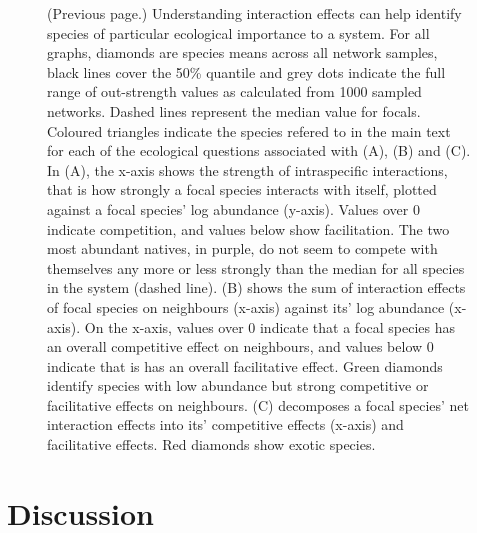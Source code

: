 \documentclass[a4,12pt]{article}
\begin{document}
    \addtocounter{figure}{-1}
	\begin{figure} [t!]
  		\caption{(Previous page.) Understanding interaction effects can help identify species of particular ecological importance to a system. For all graphs, diamonds are species means across all network samples, black lines cover the 50\% quantile and grey dots indicate the full range of out-strength values as calculated from 1000 sampled networks. Dashed lines represent the median value for focals. Coloured triangles indicate the species refered to in the main text for each of the ecological questions associated with (A), (B) and (C). \\
        In (A), the x-axis shows the strength of intraspecific interactions, that is how strongly a focal species interacts with itself, plotted against a focal species' log abundance (y-axis). Values over $0$ indicate competition, and values below show facilitation.  The two most abundant natives, in purple, do not seem to compete with themselves any more or less strongly than the median for all species in the system (dashed line). (B) shows the sum of interaction effects of focal species on neighbours (x-axis) against its' log abundance (x-axis). On the x-axis, values over $0$ indicate that a focal species has an overall competitive effect on neighbours, and values below $0$ indicate that is has an overall facilitative effect. Green diamonds identify species with low abundance but strong competitive or facilitative effects on neighbours. (C) decomposes a focal species' net interaction effects into its' competitive effects (x-axis) and facilitative effects. Red diamonds show exotic species.}%
	\end{figure}




\section{Discussion}
    
\end{document}
